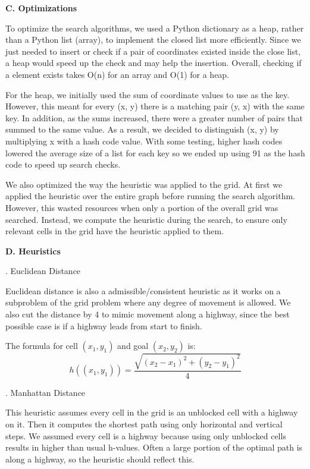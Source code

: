\documentclass[12pt, letterpaper]{article}
\begin{document}
\pagebreak %

\noindent \textbf{C. Optimizations}

To optimize the search algorithms, we used a Python dictionary as a heap, rather than a Python list (array), to implement the closed list more efficiently. Since we just needed to insert or check if a pair of coordinates existed inside the close list, a heap would speed up the check and may help the insertion. Overall, checking if a element exists takes O(n) for an array and O(1) for a heap.

For the heap, we initially used the sum of coordinate values to use as the key. However, this meant for every (x, y) there is a matching pair (y, x) with the same key. In addition, as the sums increased, there were a greater number of pairs that summed to the same value. As a result, we decided to distinguish (x, y) by multiplying x with a hash code value. With some testing, higher hash codes lowered the average size of a list for each key so we ended up using 91 as the hash code to speed up search checks.

We also optimized the way the heuristic was applied to the grid. At first we applied the heuristic over the entire graph before running the search algorithm. However, this wasted resources when only a portion of the overall grid was searched. Instead, we compute the heuristic during the search, to ensure only relevant cells in the grid have the heuristic applied to them.

\pagebreak %

\noindent \textbf{D. Heuristics}

. Euclidean Distance

Euclidean distance is also a admissible/consistent heuristic as it works on a subproblem of the grid problem where any degree of movement is allowed. We also cut the distance by 4 to mimic movement along a highway, since the best possible case is if a highway leads from start to finish.

The formula for cell $(x_1, y_1)$ and goal $(x_2, y_2)$ is:
$$h((x_1,y_1)) = \frac{\sqrt{(x_2-x_1)^2 + (y_2-y_1)^2}}{4}$$

\bigskip
{}. Manhattan Distance

This heuristic assumes every cell in the grid is an unblocked cell with a highway on it. Then it computes the shortest path using only horizontal and vertical steps. We assumed every cell is a highway because using only unblocked cells results in higher than usual h-values. Often a large portion of the optimal path is along a highway, so the heuristic should reflect this.
\end{document}
